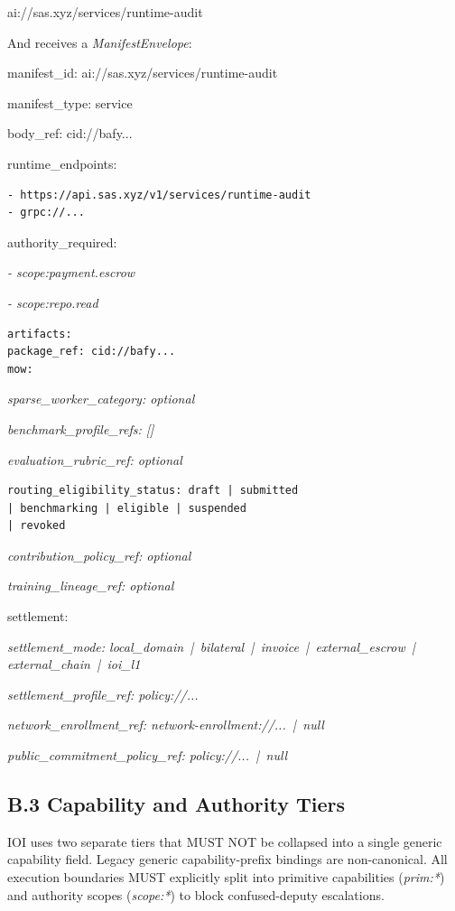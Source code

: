\documentclass[
  11pt,
]{article}
\begin{document}
ai://sas.xyz/services/runtime-audit

And receives a \emph{ManifestEnvelope}:

manifest\_id: ai://sas.xyz/services/runtime-audit

manifest\_type: service

body\_ref: cid://bafy...

runtime\_endpoints:

\begin{lstlisting}[language=rustioi]
- https://api.sas.xyz/v1/services/runtime-audit
- grpc://...
\end{lstlisting}
authority\_required:

\emph{- scope:payment.escrow}

\emph{- scope:repo.read}

\begin{lstlisting}[language=rustioi]
artifacts:
package_ref: cid://bafy...
mow:
\end{lstlisting}
\emph{sparse\_worker\_category: optional}

\emph{benchmark\_profile\_refs: {[}{]}}

\emph{evaluation\_rubric\_ref: optional}

\begin{lstlisting}[language={},basicstyle=\ttfamily\scriptsize]
routing_eligibility_status: draft | submitted
| benchmarking | eligible | suspended
| revoked
\end{lstlisting}
\emph{contribution\_policy\_ref: optional}

\emph{training\_lineage\_ref: optional}

settlement:

\emph{settlement\_mode: local\_domain \,|\, bilateral \,|\, invoice \,|\,
external\_escrow \,|\, external\_chain \,|\, ioi\_l1}

\emph{settlement\_profile\_ref: policy://...}

\emph{network\_enrollment\_ref: network-enrollment://... \,|\, null}

\emph{public\_commitment\_policy\_ref: policy://... \,|\, null}

\hypertarget{b.3-capability-and-authority-tiers}{%
\subsection{B.3 Capability and Authority
Tiers}\label{b.3-capability-and-authority-tiers}}

IOI uses two separate tiers that MUST NOT be collapsed into a single
generic capability field. Legacy generic capability-prefix bindings are
non-canonical. All execution boundaries MUST explicitly split into primitive
capabilities (\emph{prim:*}) and authority scopes (\emph{scope:*}) to
block confused-deputy escalations.
\end{document}
